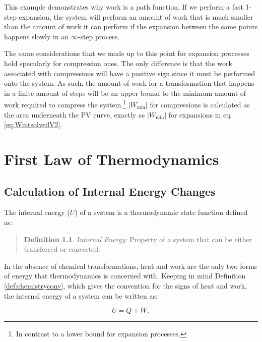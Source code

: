\documentclass[
  9pt,
]{extbook}
\theoremstyle{definition}
\newtheorem{definition}{Definition}[chapter]
\theoremstyle{definition}
\theoremstyle{definition}
\theoremstyle{remark}
\begin{document}
This example demonstrates why work is a path function. If we perform a fast 1-step expansion, the system will perform an amount of work that is much smaller than the amount of work it can perform if the expansion between the same points happens slowly in an \(\infty\)-step process.

The same considerations that we made up to this point for expansion processes hold specularly for compression ones. The only difference is that the work associated with compressions will have a positive sign since it must be performed onto the system. As such, the amount of work for a transformation that happens in a finite amount of steps will be an upper bound to the minimum amount of work required to compress the system.\footnote{In contrast to a lower bound for expansion processes.} \(\left| W_{\text{min}} \right|\) for compressions is calculated as the area underneath the PV curve, exactly as \(\left| W_{\text{min}} \right|\) for expansions in eq. \eqref{eq:WintsolvedV2}.

\hypertarget{FirstLaw}{%
\chapter{First Law of Thermodynamics}\label{FirstLaw}}

\hypertarget{energyint}{%
\section{Calculation of Internal Energy Changes}\label{energyint}}

The internal energy (\(U\)) of a system is a thermodynamic state function defined as:

\begin{quote}
\begin{definition}
\protect\hypertarget{def:energy}{}{\label{def:energy} }\emph{Internal Energy:} Property of a system that can be either transferred or converted.
\end{definition}
\end{quote}

In the absence of chemical transformations, heat and work are the only two forms of energy that thermodynamics is concerned with. Keeping in mind Definition \ref{def:chemistryconv}, which gives the convention for the signs of heat and work, the internal energy of a system can be written as:

\begin{equation}
  U = Q + W,
  \label{eq:U}
\end{equation}
\end{document}
